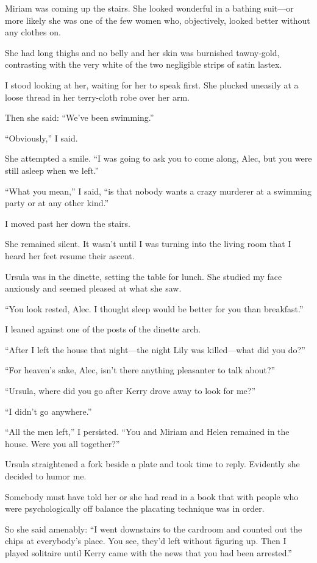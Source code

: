 \documentclass{novel}
\begin{document}
Miriam was coming up the stairs. She looked wonderful in a bathing suit—or more likely she was one of the few women who, objectively, looked better without any clothes on. 

She had long thighs and no belly and her skin was burnished tawny-gold, contrasting with the very white of the two negligible strips of satin lastex.

I stood looking at her, waiting for her to speak first. She plucked uneasily at a loose thread in her terry-cloth robe over her arm. 

Then she said: “We’ve been swimming.”

“Obviously,” I said.

She attempted a smile. “I was going to ask you to come along, Alec, but you were still asleep when we left.”

“What you mean,” I said, “is that nobody wants a crazy murderer at a swimming party or at any other kind.”

I moved past her down the stairs. 

She remained silent. It wasn’t until I was turning into the living room that I heard her feet resume their ascent.

Ursula was in the dinette, setting the table for lunch. She studied my face anxiously and seemed pleased at what she saw. 

“You look rested, Alec. I thought sleep would be better for you than breakfast.”

I leaned against one of the posts of the dinette arch.

“After I left the house that night—the night Lily was killed—what did you do?”

“For heaven’s sake, Alec, isn’t there anything pleasanter to talk about?”

“Ursula, where did you go after Kerry drove away to look for me?”

“I didn’t go anywhere.”

“All the men left,” I persisted. “You and Miriam and Helen remained in the house. Were you all together?” 

Ursula straightened a fork beside a plate and took time to reply. Evidently she decided to humor me. 

Somebody must have told her or she had read in a book that with people who were psychologically off balance the placating technique was in order. 

So she said amenably: “I went downstairs to the cardroom and counted out the chips at everybody’s place. You see, they’d left without figuring up. Then I played solitaire until Kerry came with the news that you had been arrested.”
\end{document}
